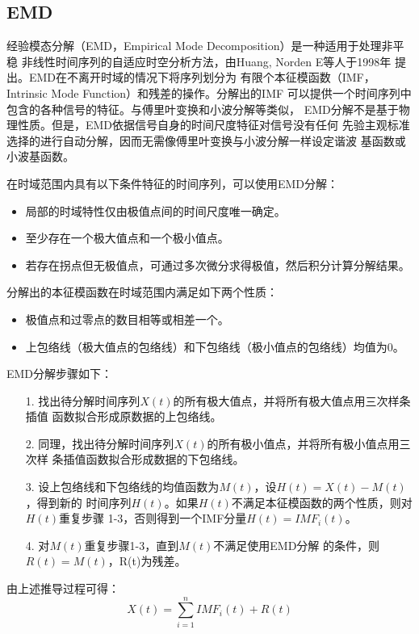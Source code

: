 \documentclass[AutoFakeBold]{LZUThesis}
\begin{document}
\subsection{EMD}
经验模态分解（EMD，Empirical Mode Decomposition）是一种适用于处理非平稳
非线性时间序列的自适应时空分析方法，由Huang, Norden E等人于1998年
提出\cite{huang1998empirical}。EMD在不离开时域的情况下将序列划分为
有限个本征模函数（IMF，Intrinsic Mode Function）和残差的操作。分解出的IMF
可以提供一个时间序列中包含的各种信号的特征。与傅里叶变换和小波分解等类似，
EMD分解不是基于物理性质。但是，EMD依据信号自身的时间尺度特征对信号没有任何
先验主观标准选择的进行自动分解，因而无需像傅里叶变换与小波分解一样设定谐波
基函数或小波基函数。

在时域范围内具有以下条件特征的时间序列，可以使用EMD分解：
\begin{itemize}
\item 局部的时域特性仅由极值点间的时间尺度唯一确定。
\item 至少存在一个极大值点和一个极小值点。
\item 若存在拐点但无极值点，可通过多次微分求得极值，然后积分计算分解结果。
\end{itemize}

分解出的本征模函数在时域范围内满足如下两个性质：
\begin{itemize}
\item 极值点和过零点的数目相等或相差一个。
\item 上包络线（极大值点的包络线）和下包络线（极小值点的包络线）均值为0。
\end{itemize}

EMD分解步骤如下：
\begin{itemize}
\item[1. ] 找出待分解时间序列$X(t)$的所有极大值点，并将所有极大值点用三次样条插值
函数拟合形成原数据的上包络线。
\item[2. ] 同理，找出待分解时间序列$X(t)$的所有极小值点，并将所有极小值点用三次样
条插值函数拟合形成数据的下包络线。
\item[3. ] 设上包络线和下包络线的均值函数为$M(t)$，设$H(t)=X(t)-M(t)$，得到新的
时间序列$H(t)$。如果$H(t)$不满足本征模函数的两个性质，则对$H(t)$重复步骤
1-3，否则得到一个IMF分量$H(t)=IMF_i(t)$。
\item[4. ] 对$M(t)$重复步骤1-3，直到$M(t)$不满足使用EMD分解
的条件，则$R(t)=M(t)$，R(t)为残差。
\end{itemize}

由上述推导过程可得：
$$
X(t)=\displaystyle\sum_{i=1} ^n IMF_i(t) +R(t)
$$
\end{document}
